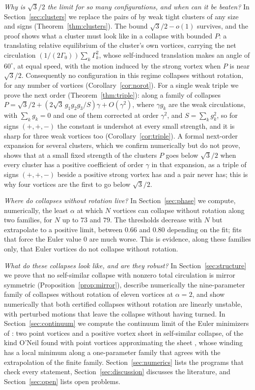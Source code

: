 \documentclass[11pt]{article}
\theoremstyle{definition}
\begin{document}
\emph{Why is $\sqrt{3}/2$ the limit for so many configurations, and when can it be beaten?} In Section~\ref{sec:clusters} we replace the pairs of \cite[Theorem~3]{mw2026} by weak tight clusters of any size and signs (Theorem~\ref{thm:clusters}). The bound $\sqrt{3}/2 - o(1)$ survives, and the proof shows what a cluster must look like in a collapse with bounded $P$: a translating relative equilibrium of the cluster's own vortices, carrying the net circulation $(1/(2\Gamma_0))\sum_k \Gamma_k^2$, whose self-induced translation makes an angle of $60^\circ$, at equal speed, with the motion induced by the strong vortex when $P$ is near $\sqrt{3}/2$. Consequently no configuration in this regime collapses without rotation, for any number of vortices (Corollary~\ref{cor:norot}). For a single weak triple we prove the next order (Theorem~\ref{thm:triple}): along a family of collapses $P = \sqrt{3}/2 + (2\sqrt{3}\,g_1g_2g_3/S)\gamma + O(\gamma^2)$, where $\gamma g_k$ are the weak circulations, with $\sum_k g_k = 0$ and one of them corrected at order $\gamma^2$, and $S = \sum_k g_k^2$, so for signs $(+,+,-)$ the constant is undershot at every small strength, and it is sharp for three weak vortices too (Corollary~\ref{cor:triple}). A formal next-order expansion for several clusters, which we confirm numerically but do not prove, shows that at a small fixed strength of the clusters $P$ goes below $\sqrt{3}/2$ when every cluster has a positive coefficient of order $\gamma$ in that expansion, as a triple of signs $(+,+,-)$ beside a positive strong vortex has and a pair never has; this is why four vortices are the first to go below $\sqrt{3}/2$.

\emph{Where do collapses without rotation live?} In Section~\ref{sec:phase} we compute, numerically, the least $\alpha$ at which $N$ vortices can collapse without rotation along two families, for $N$ up to $73$ and $79$. The thresholds decrease with $N$ but extrapolate to a positive limit, between $0.66$ and $0.80$ depending on the fit; fits that force the Euler value $0$ are much worse. This is evidence, along these families only, that Euler vortices do not collapse without rotation.

\emph{What do these collapses look like, and are they robust?} In Section~\ref{sec:structure} we prove that no self-similar collapse with nonzero total circulation is mirror symmetric (Proposition~\ref{prop:mirror}), describe numerically the nine-parameter family of collapses without rotation of eleven vortices at $\alpha = 2$, and show numerically that both certified collapses without rotation are linearly unstable, with perturbed motions that leave the collapse without having turned. In Section~\ref{sec:continuum} we compute the continuum limit of the Euler minimizers of \cite[Sect.~7]{mw2026}: two point vortices and a positive vortex sheet in self-similar collapse, of the kind O'Neil found with point vortices approximating the sheet \cite{oneil2010}, whose winding has a local minimum along a one-parameter family that agrees with the extrapolation of the finite family. Section~\ref{sec:numerics} lists the programs that check every statement, Section~\ref{sec:discussion} discusses the literature, and Section~\ref{sec:open} lists open problems.
\end{document}
